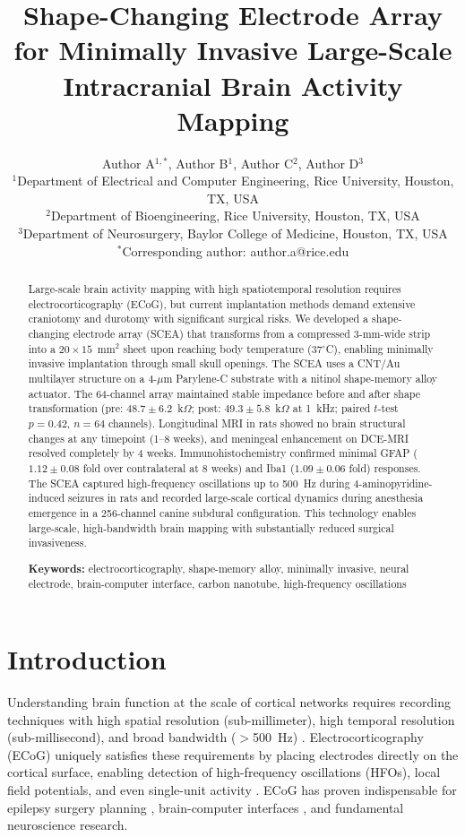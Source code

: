 \documentclass[11pt]{article}
\title{Shape-Changing Electrode Array for Minimally Invasive Large-Scale Intracranial Brain Activity Mapping}
\author{%
  Author A$^{1,*}$, Author B$^{1}$, Author C$^{2}$, Author D$^{3}$ \\[6pt]
  $^{1}$Department of Electrical and Computer Engineering, Rice University, Houston, TX, USA \\
  $^{2}$Department of Bioengineering, Rice University, Houston, TX, USA \\
  $^{3}$Department of Neurosurgery, Baylor College of Medicine, Houston, TX, USA \\
  $^{*}$Corresponding author: author.a@rice.edu
}
\date{}
\begin{document}
\maketitle

\begin{abstract}
Large-scale brain activity mapping with high spatiotemporal resolution requires electrocorticography (ECoG), but current implantation methods demand extensive craniotomy and durotomy with significant surgical risks. We developed a shape-changing electrode array (SCEA) that transforms from a compressed 3-mm-wide strip into a $20 \times 15$~mm$^2$ sheet upon reaching body temperature (37$^\circ$C), enabling minimally invasive implantation through small skull openings. The SCEA uses a CNT/Au multilayer structure on a 4-$\mu$m Parylene-C substrate with a nitinol shape-memory alloy actuator. The 64-channel array maintained stable impedance before and after shape transformation (pre: $48.7 \pm 6.2$~k$\Omega$; post: $49.3 \pm 5.8$~k$\Omega$ at 1~kHz; paired $t$-test $p = 0.42$, $n = 64$ channels). Longitudinal MRI in rats showed no brain structural changes at any timepoint (1--8 weeks), and meningeal enhancement on DCE-MRI resolved completely by 4 weeks. Immunohistochemistry confirmed minimal GFAP ($1.12 \pm 0.08$ fold over contralateral at 8 weeks) and Iba1 ($1.09 \pm 0.06$ fold) responses. The SCEA captured high-frequency oscillations up to 500~Hz during 4-aminopyridine-induced seizures in rats and recorded large-scale cortical dynamics during anesthesia emergence in a 256-channel canine subdural configuration. This technology enables large-scale, high-bandwidth brain mapping with substantially reduced surgical invasiveness.

\medskip
\noindent\textbf{Keywords:} electrocorticography, shape-memory alloy, minimally invasive, neural electrode, brain-computer interface, carbon nanotube, high-frequency oscillations
\end{abstract}

\section{Introduction}

Understanding brain function at the scale of cortical networks requires recording techniques with high spatial resolution (sub-millimeter), high temporal resolution (sub-millisecond), and broad bandwidth ($>$500~Hz) \citep{buzsaki2012origin, engel2005invasive}. Electrocorticography (ECoG) uniquely satisfies these requirements by placing electrodes directly on the cortical surface, enabling detection of high-frequency oscillations (HFOs), local field potentials, and even single-unit activity \citep{khodagholy2015neurogrid, viventi2011flexible}. ECoG has proven indispensable for epilepsy surgery planning \citep{litt2001epileptic, worrell2004high}, brain-computer interfaces \citep{schalk2007decoding}, and fundamental neuroscience research.
\end{document}
